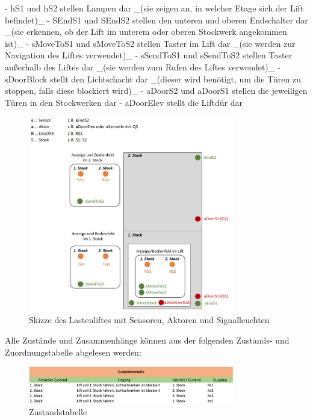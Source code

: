 \begin{markdown}
- hS1 und hS2 stellen Lampen dar _(sie zeigen an, in welcher Etage sich der Lift befindet)_
- SEndS1 und SEndS2 stellen den unteren und oberen Endschalter dar _(sie erkennen, ob der Lift im unterem oder oberen Stockwerk angekommen ist)_
- sMoveToS1 und sMoveToS2 stellen Taster im Lift dar _(sie werden zur Navigation des Liftes verwendet)_
- sSendToS1 und sSendToS2 stellen Taster außerhalb des Liftes dar _(sie werden zum Rufen des Liftes verwendet)_
- sDoorBlock stellt den Lichtschacht dar _(dieser wird benötigt, um die Türen zu stoppen, falls diese blockiert wird)_ 
- aDoorS2 und aDoorS1 stellen die jeweiligen Türen in den Stockwerken dar
- aDoorElev stellt die Liftdür dar

\begin{figure}[H]
    \centering
    \includegraphics[width=0.8\textwidth]{./images/Skizze.png}
    \caption[Skizze des Lastenliftes]{Skizze des Lastenliftes mit Sensoren, Aktoren und Signalleuchten}
\end{figure}

Alle Zustände und Zusammenhänge können aus der folgenden Zustands- und Zuordnungstabelle abgelesen werden:

\begin{figure}[H]
    \centering
    \includegraphics[width=0.8\textwidth]{./images/Zustandstabelle.png}
    \caption[Zustandstabelle]{Zustandstabelle}
\end{figure}


\end{markdown}
